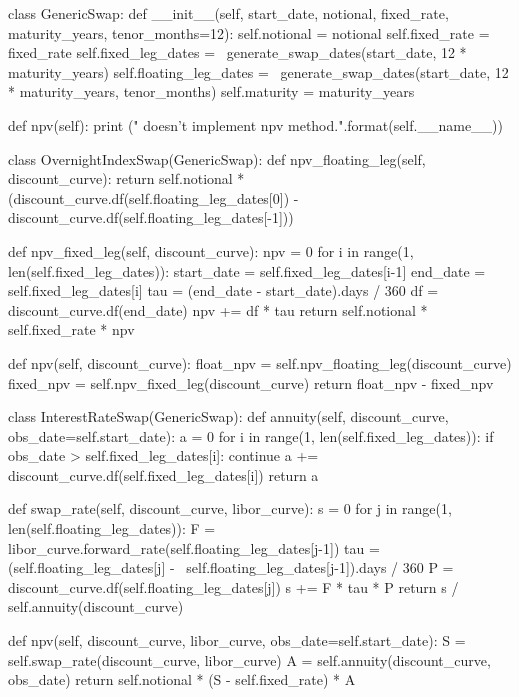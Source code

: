 \begin{ipython}
class GenericSwap:
    def __init__(self, start_date, notional,
        fixed_rate, maturity_years, tenor_months=12):
        self.notional = notional
        self.fixed_rate = fixed_rate
        self.fixed_leg_dates = \
            generate_swap_dates(start_date, 12 * maturity_years)
        self.floating_leg_dates = \
            generate_swap_dates(start_date, 12 * maturity_years, tenor_months)
        self.maturity = maturity_years

    def npv(self):
        print ("{} doesn't implement npv method.".format(self.__name__))

class OvernightIndexSwap(GenericSwap):
    def npv_floating_leg(self, discount_curve):
        return self.notional * (discount_curve.df(self.floating_leg_dates[0]) -
            discount_curve.df(self.floating_leg_dates[-1]))

    def npv_fixed_leg(self, discount_curve):
        npv = 0
        for i in range(1, len(self.fixed_leg_dates)):
            start_date = self.fixed_leg_dates[i-1]
            end_date = self.fixed_leg_dates[i]
            tau = (end_date - start_date).days / 360
            df = discount_curve.df(end_date)
            npv += df * tau 
        return self.notional * self.fixed_rate * npv

    def npv(self, discount_curve):
        float_npv = self.npv_floating_leg(discount_curve)
        fixed_npv = self.npv_fixed_leg(discount_curve)
        return float_npv - fixed_npv

class InterestRateSwap(GenericSwap):
    def annuity(self, discount_curve, obs_date=self.start_date):
        a = 0
        for i in range(1, len(self.fixed_leg_dates)):
            if obs_date > self.fixed_leg_dates[i]:
                continue
            a += discount_curve.df(self.fixed_leg_dates[i])
        return a

    def swap_rate(self, discount_curve, libor_curve):
        s = 0
        for j in range(1, len(self.floating_leg_dates)):
            F = libor_curve.forward_rate(self.floating_leg_dates[j-1])
            tau = (self.floating_leg_dates[j] - \
                self.floating_leg_dates[j-1]).days / 360
            P = discount_curve.df(self.floating_leg_dates[j])
            s += F * tau * P
        return s / self.annuity(discount_curve)

    def npv(self, discount_curve, libor_curve, obs_date=self.start_date):
        S = self.swap_rate(discount_curve, libor_curve)
        A = self.annuity(discount_curve, obs_date)
        return self.notional * (S - self.fixed_rate) * A
\end{ipython}

